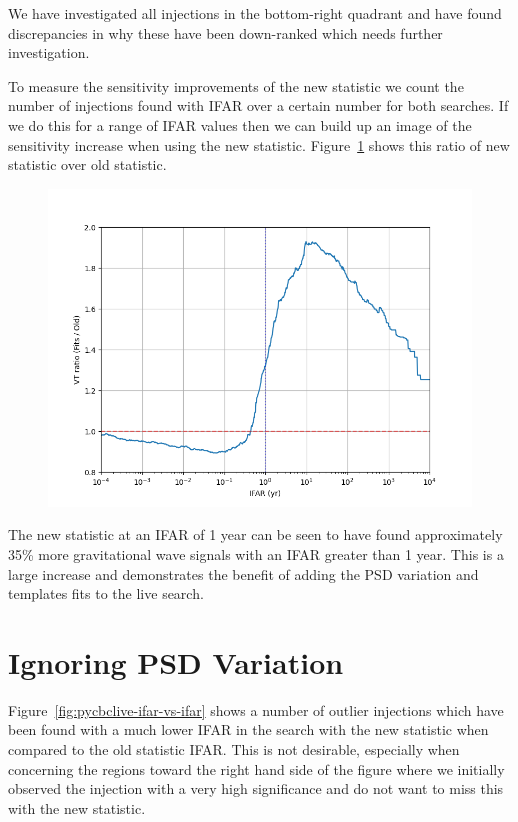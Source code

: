 We have investigated all injections in the bottom-right quadrant and have found discrepancies in why these have been down-ranked which needs further investigation.

To measure the sensitivity improvements of the new statistic we count the number of injections found with IFAR over a certain number for both searches. If we do this for a range of IFAR values then we can build up an image of the sensitivity increase when using the new statistic. Figure~\ref{fig:pycbclive-sensitivity} shows this ratio of new statistic over old statistic.
%
\begin{figure}
       \centering
    \includegraphics[width=1.0\textwidth]{images/pycbclive/ratio.png}
    \caption{}
    \label{fig:pycbclive-sensitivity}
\end{figure}
%
The new statistic at an IFAR of 1 year can be seen to have found approximately 35\% more gravitational wave signals with an IFAR greater than 1 year. This is a large increase and demonstrates the benefit of adding the PSD variation and templates fits to the live search.

\section{\label{pycbclive-ignoring-psdvar}Ignoring PSD Variation}

Figure~\ref{fig:pycbclive-ifar-vs-ifar} shows a number of outlier injections which have been found with a much lower IFAR in the search with the new statistic when compared to the old statistic IFAR. This is not desirable, especially when concerning the regions toward the right hand side of the figure where we initially observed the injection with a very high significance and do not want to miss this with the new statistic.

